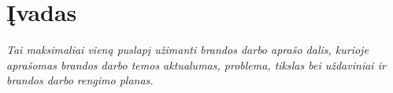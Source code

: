 \newpage
\section{Įvadas}
\textit{Tai maksimaliai vieną puslapį užimanti brandos darbo aprašo dalis, kurioje aprašomas brandos darbo temos aktualumas, problema, tikslas bei uždaviniai ir brandos darbo rengimo planas.}\par
\lipsum[3]\par
\lipsum[4]

